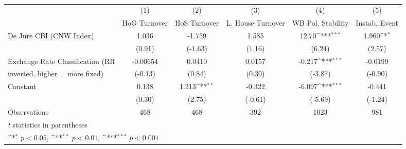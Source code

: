 \begin{table}[htbp]\centering
\def\sym#1{\ifmmode^{#1}\else\(^{#1}\)\fi}
\caption{\label{hiKfivs}}
\begin{tabular}{l*{5}{c}}
\toprule
                                        &\multicolumn{1}{c}{(1)}&\multicolumn{1}{c}{(2)}&\multicolumn{1}{c}{(3)}&\multicolumn{1}{c}{(4)}&\multicolumn{1}{c}{(5)}\\
                                        &\multicolumn{1}{c}{HoG Turnover}&\multicolumn{1}{c}{HoS Turnover}&\multicolumn{1}{c}{L. House Turnover}&\multicolumn{1}{c}{WB Pol. Stability}&\multicolumn{1}{c}{Instab. Event}\\
\midrule
De Jure CBI (CNW Index)                 &    1.036         &   -1.759         &    1.585         &    12.70\sym{***}&    1.960\sym{*}  \\
                                        &   (0.91)         &  (-1.63)         &   (1.16)         &   (6.24)         &   (2.57)         \\
\addlinespace
Exchange Rate Classification (RR        & -0.00654         &   0.0410         &   0.0157         &   -0.217\sym{***}&  -0.0199         \\
inverted, higher = more fixed)          &  (-0.13)         &   (0.84)         &   (0.30)         &  (-3.87)         &  (-0.90)         \\
\addlinespace
Constant                                &    0.138         &    1.213\sym{**} &   -0.322         &   -6.097\sym{***}&   -0.441         \\
                                        &   (0.30)         &   (2.75)         &  (-0.61)         &  (-5.69)         &  (-1.24)         \\
\midrule
Observations                            &      468         &      468         &      392         &     1023         &      981         \\
\bottomrule
\multicolumn{6}{l}{\footnotesize \textit{t} statistics in parentheses}\\
\multicolumn{6}{l}{\footnotesize \sym{*} \(p<0.05\), \sym{**} \(p<0.01\), \sym{***} \(p<0.001\)}\\
\end{tabular}
\end{table}
